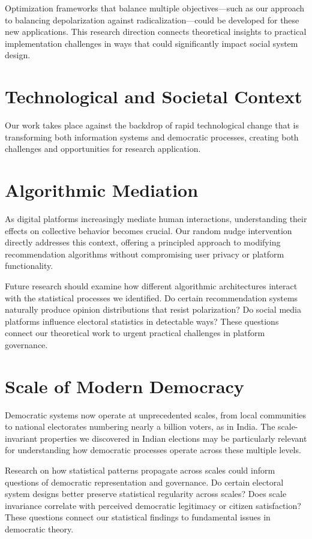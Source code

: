 Optimization frameworks that balance multiple objectives—such as our approach to balancing depolarization against radicalization—could be developed for these new applications. This research direction connects theoretical insights to practical implementation challenges in ways that could significantly impact social system design.

\section{Technological and Societal Context}

Our work takes place against the backdrop of rapid technological change that is transforming both information systems and democratic processes, creating both challenges and opportunities for research application.

\section{Algorithmic Mediation}

As digital platforms increasingly mediate human interactions, understanding their effects on collective behavior becomes crucial. Our random nudge intervention directly addresses this context, offering a principled approach to modifying recommendation algorithms without compromising user privacy or platform functionality.

Future research should examine how different algorithmic architectures interact with the statistical processes we identified. Do certain recommendation systems naturally produce opinion distributions that resist polarization? Do social media platforms influence electoral statistics in detectable ways? These questions connect our theoretical work to urgent practical challenges in platform governance.

\section{Scale of Modern Democracy}

Democratic systems now operate at unprecedented scales, from local communities to national electorates numbering nearly a billion voters, as in India. The scale-invariant properties we discovered in Indian elections may be particularly relevant for understanding how democratic processes operate across these multiple levels.

Research on how statistical patterns propagate across scales could inform questions of democratic representation and governance. Do certain electoral system designs better preserve statistical regularity across scales? Does scale invariance correlate with perceived democratic legitimacy or citizen satisfaction? These questions connect our statistical findings to fundamental issues in democratic theory.

